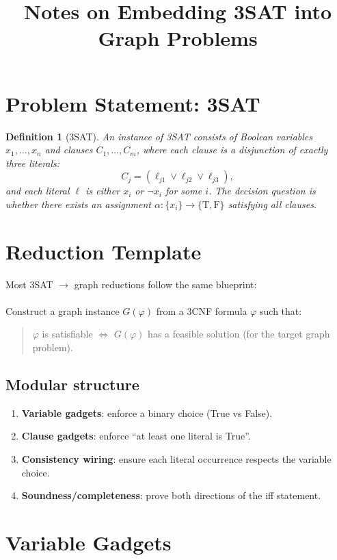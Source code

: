 \documentclass[11pt]{article}
\title{\vspace{-1.2cm}Notes on Embedding 3SAT into Graph Problems}
\date{}
\newtheorem{definition}{Definition}
\begin{document}
\maketitle

\section{Problem Statement: 3SAT}
\begin{definition}[3SAT]
An instance of \emph{3SAT} consists of Boolean variables $x_1,\dots,x_n$ and clauses $C_1,\dots,C_m$, where each clause is a disjunction of exactly three literals:
\[
C_j = (\ell_{j1} \lor \ell_{j2} \lor \ell_{j3}),
\]
and each literal $\ell$ is either $x_i$ or $\neg x_i$ for some $i$. The decision question is whether there exists an assignment $\alpha:\{x_i\}\to\{\text{T},\text{F}\}$ satisfying all clauses.
\end{definition}

\section{Reduction Template}
Most 3SAT $\to$ graph reductions follow the same blueprint:
\\\\
Construct a graph instance $G(\varphi)$ from a 3CNF formula $\varphi$ such that:
\begin{quote}
$\varphi$ is satisfiable $\iff$ $G(\varphi)$ has a feasible solution (for the target graph problem).
\end{quote}

\subsection*{Modular structure}
\begin{enumerate}[itemsep=2pt]
  \item \textbf{Variable gadgets}: enforce a binary choice (True vs False).
  \item \textbf{Clause gadgets}: enforce ``at least one literal is True''.
  \item \textbf{Consistency wiring}: ensure each literal occurrence respects the variable choice.
  \item \textbf{Soundness/completeness}: prove both directions of the iff statement.
\end{enumerate}

\section{Variable Gadgets}
\end{document}
